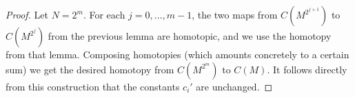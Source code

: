 \documentclass[11pt]{amsart}
\numberwithin{equation}{section}
\numberwithin{theorem}{section}
\theoremstyle{definition}
\begin{document}
\begin{proof} Let $N=2^m$. For each $j=0,\ldots,m-1$, the two maps from $C(M^{2^{j+1}})$ to $C(M^{2^j})$ from the previous lemma are homotopic, and we use the homotopy from that lemma. Composing homotopies (which amounts concretely to a certain sum) we get the desired homotopy from $C(M^{2^m})$ to $C(M)$. It follows directly from this construction that the constants $c_i'$ are unchanged.
\end{proof}

\newpage




\end{document}
